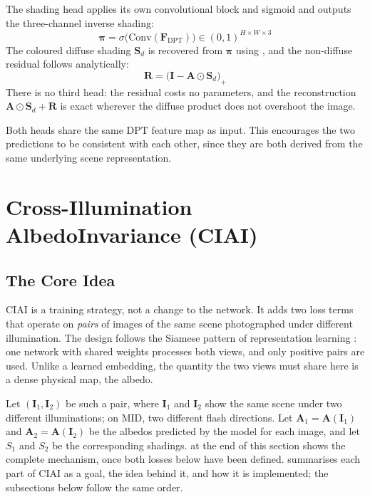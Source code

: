 The shading head applies its own convolutional block and sigmoid and outputs the
three-channel inverse shading:
\begin{equation}
  \boldsymbol{\pi} = \sigma\bigl(\text{Conv}(\mathbf{F}_{\text{DPT}})\bigr)
  \in (0, 1)^{H \times W \times 3}
  \label{eq:shading_head}
\end{equation}
The coloured diffuse shading $\mathbf{S}_d$ is recovered from $\boldsymbol{\pi}$
using , and the non-diffuse residual follows analytically:
\begin{equation}
  \mathbf{R} = \bigl(\mathbf{I} - \mathbf{A} \odot \mathbf{S}_d\bigr)_{+}
  \label{eq:residual}
\end{equation}
There is no third head: the residual costs no parameters, and the reconstruction
$\mathbf{A} \odot \mathbf{S}_d + \mathbf{R}$ is exact wherever the diffuse
product does not overshoot the image.

Both heads share the same DPT feature map as input.
This encourages the two predictions to be consistent with each other, since they
are both derived from the same underlying scene representation.




\section[Cross-Illumination Albedo Invariance (CIAI)]{Cross-Illumination Albedo\newline Invariance (CIAI)}
\label{sec:ciai}

\subsection{The Core Idea}

CIAI is a training strategy, not a change to the network.
It adds two loss terms that operate on \emph{pairs} of images of the same scene
photographed under different illumination. The design follows the Siamese pattern of
representation learning : one network with shared weights processes
both views, and only positive pairs are used. Unlike a learned embedding, the quantity the
two views must share here is a dense physical map, the albedo.

Let $(\mathbf{I}_1, \mathbf{I}_2)$ be such a pair, where $\mathbf{I}_1$ and
$\mathbf{I}_2$ show the same scene under two different illuminations; on MID, two
different flash directions.
Let $\mathbf{A}_1 = \mathbf{A}(\mathbf{I}_1)$ and $\mathbf{A}_2 = \mathbf{A}(\mathbf{I}_2)$
be the albedos predicted by the model for each image, and let $S_1$ and $S_2$ be
the corresponding shadings.
 at the end of this section shows the complete mechanism, once
both losses below have been defined.  summarises each part of CIAI
as a goal, the idea behind it, and how it is implemented; the subsections below follow the
same order.

